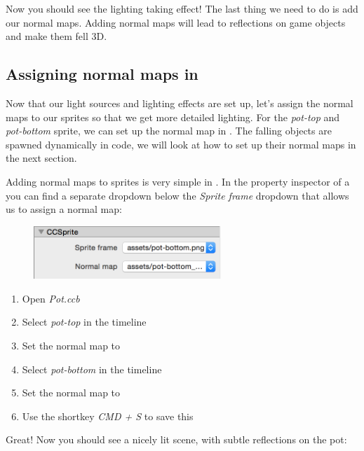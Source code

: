 Now you should see the lighting taking effect! The last thing we need to do is
add our normal maps. Adding normal maps will lead to reflections on game objects
and make them fell 3D.

\subsection{Assigning normal maps in \SB{}}
Now that our light sources and lighting effects are set up, let's assign the
normal maps to our sprites so that we get more detailed lighting. For the \textit{pot-top}
and \textit{pot-bottom} sprite, we can set up the normal map in \SB{}. The
falling objects are spawned dynamically in code, we will look at how to set up
their normal maps in the next section.

Adding normal maps to sprites is very simple in \SB{}. In the property
inspector of a \ccsprite{} you can find a separate dropdown below the
\textit{Sprite frame} dropdown that allows us to assign a normal map:

\begin{figure}[H]
  \centering
  \includegraphics[width=200pt]{images/Chapter9/select_normal_map.png}
\end{figure}

\begin{leftbar}
\begin{enumerate}
  \item Open \textit{Pot.ccb}
  \item Select \textit{pot-top} in the timeline 
  \item Set the normal map to 
  \item Select \textit{pot-bottom} in the timeline
  \item Set the normal map to 
  \item Use the shortkey \textit{CMD + S} to save this \ccbfile{}
\end{enumerate}
\end{leftbar}

Great! Now you should see a nicely lit scene, with subtle reflections on the
pot:

